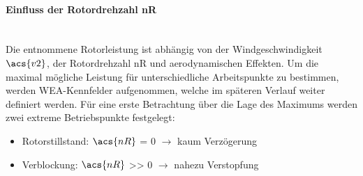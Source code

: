 \paragraph{Einfluss der Rotordrehzahl \acs{nR}}\mbox{}\smallskip\\
Die entnommene Rotorleistung ist abhängig von der Windgeschwindigkeit $\acs{v2}$, der Rotordrehzahl \acs{nR} und aerodynamischen Effekten. Um die maximal mögliche Leistung für unterschiedliche Arbeitspunkte zu bestimmen, werden WEA-Kennfelder aufgenommen, welche im späteren Verlauf weiter definiert werden. Für eine erste Betrachtung über die Lage des Maximums werden zwei extreme Betriebspunkte festgelegt:
\begin{itemize}
    \item Rotorstillstand: $\acs{nR}$ = 0 $\rightarrow$ kaum Verzögerung
    \item Verblockung: $\acs{nR}$ >> 0 $\rightarrow$ nahezu Verstopfung
\end{itemize}

